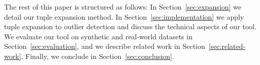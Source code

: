 The rest of this paper is structured as follows: In Section~\ref{sec:expansion} we detail our tuple expansion method. In Section~\ref{sec:implementation} we apply tuple expansion to outlier detection and discuss the technical aspects of our tool. We evaluate our tool on synthetic and real-world datasets in Section~\ref{sec:evaluation}, and we describe related work in Section~\ref{sec:related-work}. Finally, we conclude in Section~\ref{sec:conclusion}. %
